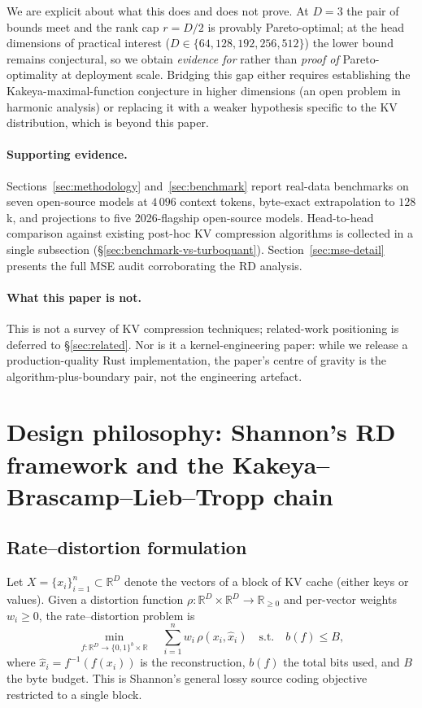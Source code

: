 \documentclass[11pt,a4paper]{article}
\theoremstyle{definition}
\theoremstyle{plain}
\newcommand{\R}{\mathbb{R}}
\begin{document}
We are explicit about what this does and does not prove. At $D = 3$ the pair of bounds meet and the rank cap $r = D/2$ is provably Pareto-optimal; at the head dimensions of practical interest ($D \in \{64, 128, 192, 256, 512\}$) the lower bound remains conjectural, so we obtain \emph{evidence for} rather than \emph{proof of} Pareto-optimality at deployment scale. Bridging this gap either requires establishing the Kakeya-maximal-function conjecture in higher dimensions (an open problem in harmonic analysis) or replacing it with a weaker hypothesis specific to the KV distribution, which is beyond this paper.

\paragraph{Supporting evidence.}
Sections~\ref{sec:methodology} and~\ref{sec:benchmark} report real-data benchmarks on seven open-source models at $4\,096$ context tokens, byte-exact extrapolation to $128$k, and projections to five 2026-flagship open-source models. Head-to-head comparison against existing post-hoc KV compression algorithms is collected in a single subsection (\S\ref{sec:benchmark-vs-turboquant}). Section~\ref{sec:mse-detail} presents the full MSE audit corroborating the RD analysis.

\paragraph{What this paper is not.}
This is not a survey of KV compression techniques; related-work positioning is deferred to \S\ref{sec:related}. Nor is it a kernel-engineering paper: while we release a production-quality Rust implementation, the paper's centre of gravity is the algorithm-plus-boundary pair, not the engineering artefact.

\section{Design philosophy: Shannon's RD framework and the Kakeya--Brascamp--Lieb--Tropp chain}
\label{sec:framework}

\subsection{Rate--distortion formulation}
Let $X = \{x_i\}_{i=1}^n \subset \R^D$ denote the vectors of a block of KV cache (either keys or values). Given a distortion function $\rho: \R^D \times \R^D \to \R_{\geq 0}$ and per-vector weights $w_i \geq 0$, the rate--distortion problem is
\begin{equation}
\label{eq:rd}
\min_{f: \R^D \to \{0,1\}^b \times \R} \quad \sum_{i=1}^n w_i \, \rho(x_i, \hat{x}_i)
\quad \text{s.t.} \quad b(f) \leq B,
\end{equation}
where $\hat{x}_i = f^{-1}(f(x_i))$ is the reconstruction, $b(f)$ the total bits used, and $B$ the byte budget. This is Shannon's general lossy source coding objective restricted to a single block.
\end{document}

